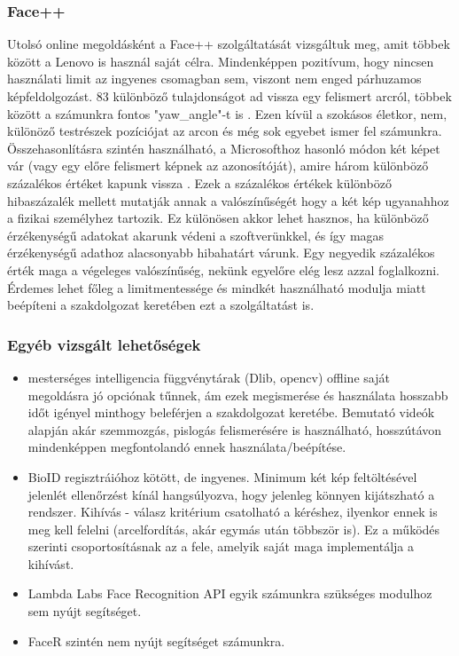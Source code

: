 \subsubsection{Face++}
Utolsó online megoldásként a Face++ szolgáltatását vizsgáltuk meg, amit többek között a Lenovo is használ saját célra. Mindenképpen pozitívum, hogy nincsen használati limit az ingyenes csomagban sem, viszont nem enged párhuzamos képfeldolgozást. 83 különböző tulajdonságot ad vissza egy felismert arcról, többek között a számunkra fontos "yaw\_angle"-t is \cite{FACEPP}. Ezen kívül a szokásos életkor, nem, különöző testrészek pozíciójat az arcon és még sok egyebet ismer fel számunkra.
\\Összehasonlításra szintén használható, a Microsofthoz hasonló módon két képet vár (vagy egy előre felismert képnek az azonosítóját), amire három különböző százalékos értéket kapunk vissza \cite{FACEPP_COMPARE}. Ezek a százalékos értékek különböző hibaszázalék mellett mutatják annak a valószínűségét hogy a két kép ugyanahhoz a fizikai személyhez tartozik. Ez különösen akkor lehet hasznos, ha különböző érzékenységű adatokat akarunk védeni a szoftverünkkel, és így magas érzékenységű adathoz alacsonyabb hibahatárt várunk. Egy negyedik százalékos érték maga a végeleges valószínűség, nekünk egyelőre elég lesz azzal foglalkozni. Érdemes lehet főleg a limitmentessége és mindkét használható modulja miatt beépíteni a szakdolgozat keretében ezt a szolgáltatást is. 

\subsubsection{Egyéb vizsgált lehetőségek}

\begin{itemize}
\item mesterséges intelligencia függvénytárak (Dlib, opencv) offline saját megoldásra jó opciónak tűnnek, ám ezek megismerése és használata hosszabb időt igényel minthogy beleférjen a szakdolgozat keretébe. Bemutató videók alapján akár szemmozgás, pislogás felismerésére is használható, hosszútávon mindenképpen megfontolandó ennek használata/beépítése.
\item BioID regisztráióhoz kötött, de ingyenes. Minimum két kép feltöltésével jelenlét ellenőrzést kínál hangsúlyozva, hogy jelenleg könnyen kijátszható a rendszer. Kihívás - válasz kritérium csatolható a kéréshez, ilyenkor ennek is meg kell felelni (arcelfordítás, akár egymás után többször is). Ez a működés szerinti csoportosításnak az a fele, amelyik saját maga implementálja a kihívást.
\item Lambda Labs Face Recognition API egyik számunkra szükséges modulhoz sem nyújt segítséget.
\item FaceR szintén nem nyújt segítséget számunkra.
\end{itemize}

